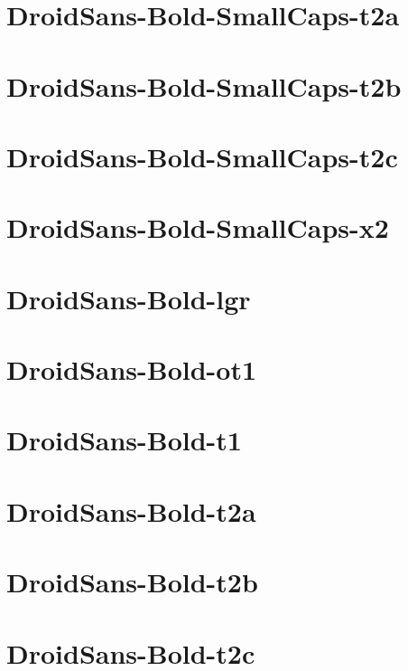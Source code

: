 \documentclass{article}
\begin{document}
\section{DroidSans-Bold-SmallCaps-t2a}

\section{DroidSans-Bold-SmallCaps-t2b}

\section{DroidSans-Bold-SmallCaps-t2c}

\section{DroidSans-Bold-SmallCaps-x2}

\section{DroidSans-Bold-lgr}

\section{DroidSans-Bold-ot1}

\section{DroidSans-Bold-t1}

\section{DroidSans-Bold-t2a}

\section{DroidSans-Bold-t2b}

\section{DroidSans-Bold-t2c}
\end{document}
